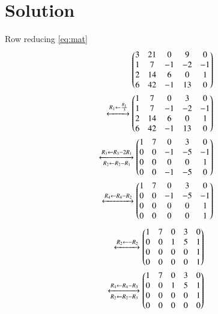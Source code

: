 \documentclass[journal,12pt,twocolumn]{IEEEtran}
\begin{document}
\section{Solution}
Row reducing \eqref{eq:mat}
\begin{align}
\begin{pmatrix}3&21&0&9&0\\1&7&-1&-2&-1\\2&14&6&0&1\\6&42&-1&13&0\end{pmatrix} \nonumber\\
\xleftrightarrow[]{R_1\leftarrow\frac{R_1}{3}}
\begin{pmatrix}1&7&0&3&0\\1&7&-1&-2&-1\\2&14&6&0&1\\6&42&-1&13&0\end{pmatrix} \nonumber \\
\xleftrightarrow[R_2\leftarrow R_2-R_1]{R_3\leftarrow R_3-2R_1}\begin{pmatrix}1&7&0&3&0\\0&0&-1&-5&-1\\0&0&0&0&1\\0&0&-1&-5&0\end{pmatrix}  \nonumber\\
\xleftrightarrow[]{R_4\leftarrow R_4-R_2}\begin{pmatrix}1&7&0&3&0\\0&0&-1&-5&-1\\0&0&0&0&1\\0&0&0&0&1\end{pmatrix}  \nonumber
\end{align}
\begin{align}
\xleftrightarrow[]{R_2\leftarrow -R_2}\begin{pmatrix}1&7&0&3&0\\0&0&1&5&1\\0&0&0&0&1\\0&0&0&0&1\end{pmatrix}  \nonumber\\
\xleftrightarrow[R_2\leftarrow R_2-R_3]{R_4\leftarrow R_4-R_3}\begin{pmatrix}1&7&0&3&0\\0&0&1&5&1\\0&0&0&0&1\\0&0&0&0&0\end{pmatrix} \label{eq:rref}
\end{align}
\end{document}
